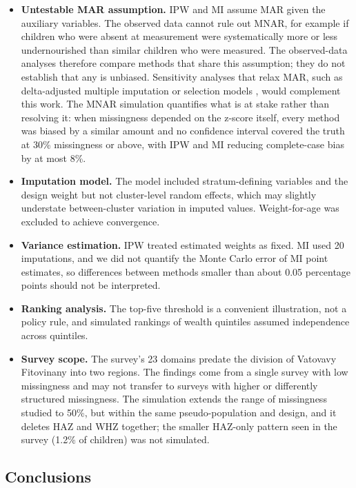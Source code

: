 \documentclass[11pt,a4paper]{article}
\providecommand{\tightlist}{\setlength{\itemsep}{0pt}\setlength{\parskip}{0pt}}
\begin{document}
\begin{itemize}
\tightlist
\item
  \textbf{Untestable MAR assumption.} IPW and MI assume MAR given the
  auxiliary variables. The observed data cannot rule out MNAR, for
  example if children who were absent at measurement were systematically
  more or less undernourished than similar children who were measured.
  The observed-data analyses therefore compare methods that share this
  assumption; they do not establish that any is unbiased. Sensitivity
  analyses that relax MAR, such as delta-adjusted multiple imputation
  \cite{leacy2017analyses} or selection models
  \cite{barnighausen2011correcting}, would complement this work. The
  MNAR simulation quantifies what is at stake rather than resolving it:
  when missingness depended on the z-score itself, every method was
  biased by a similar amount and no confidence interval covered the
  truth at 30\% missingness or above, with IPW and MI reducing
  complete-case bias by at most 8\%.
\item
  \textbf{Imputation model.} The model included stratum-defining
  variables and the design weight but not cluster-level random effects,
  which may slightly understate between-cluster variation in imputed
  values. Weight-for-age was excluded to achieve convergence.
\item
  \textbf{Variance estimation.} IPW treated estimated weights as fixed.
  MI used 20 imputations, and we did not quantify the Monte Carlo error
  of MI point estimates, so differences between methods smaller than
  about 0.05 percentage points should not be interpreted.
\item
  \textbf{Ranking analysis.} The top-five threshold is a convenient
  illustration, not a policy rule, and simulated rankings of wealth
  quintiles assumed independence across quintiles.
\item
  \textbf{Survey scope.} The survey's 23 domains predate the division of
  Vatovavy Fitovinany into two regions. The findings come from a single
  survey with low missingness and may not transfer to surveys with
  higher or differently structured missingness. The simulation extends
  the range of missingness studied to 50\%, but within the same
  pseudo-population and design, and it deletes HAZ and WHZ together; the
  smaller HAZ-only pattern seen in the survey (1.2\% of children) was
  not simulated.
\end{itemize}

\subsection{Conclusions}\label{conclusions}
\end{document}
